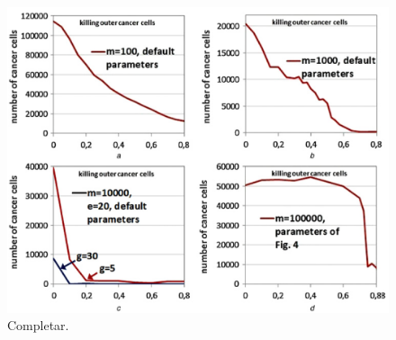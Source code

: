 \begin{figure}[h]
\centering
\includegraphics[scale=0.7]{figures/experiments/exp8}
\caption{Completar.}
\end{figure}

